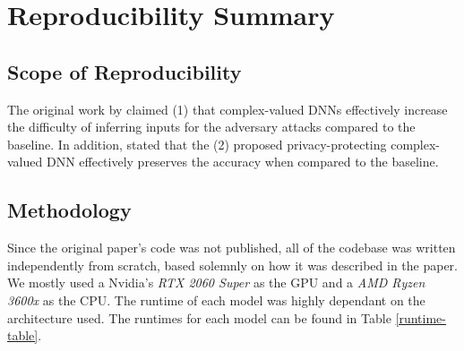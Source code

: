 \section*{\centering Reproducibility Summary}


\subsection*{Scope of Reproducibility}
The original work by  \citet{xiang2020interpretable} claimed (1) that complex-valued DNNs effectively increase the difficulty of inferring inputs for the adversary attacks compared to the baseline. 
In addition, \citet{xiang2020interpretable} stated that the (2) proposed privacy-protecting complex-valued DNN effectively preserves the accuracy when compared to the baseline.

\subsection*{Methodology}


Since the original paper's code was not published, all of the codebase was written independently from scratch, based solemnly on how it was described in the paper. We mostly used a Nvidia's \textit{RTX 2060 Super} as the GPU and a \textit{AMD Ryzen 3600x} as the CPU.  The runtime of each model was highly dependant on the architecture used. The runtimes for each model can be found in Table \ref{runtime-table}.
